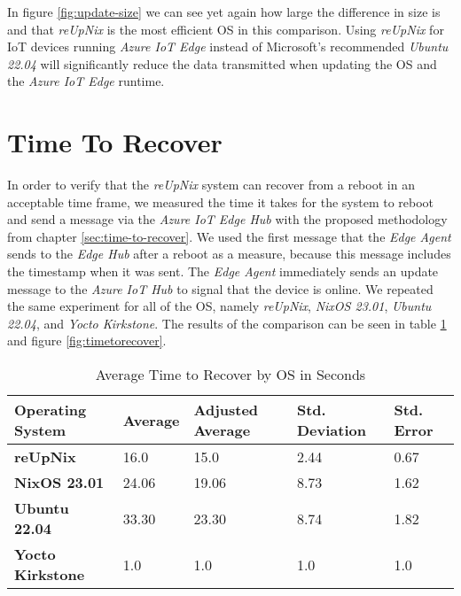 \noindent
In figure \ref{fig:update-size} we can see yet again how large the difference
in size is and that \textit{reUpNix} is the most efficient \ac{OS} in this comparison.
Using \textit{reUpNix} for \ac{IoT} devices running \textit{Azure IoT Edge}
instead of Microsoft's recommended \textit{Ubuntu 22.04} will significantly reduce
the data transmitted when updating the \ac{OS} and the \textit{Azure IoT Edge} runtime.

\section{Time To Recover}
In order to verify that the \textit{reUpNix} system can recover from a reboot
in an acceptable time frame, we measured the time it takes for the system to
reboot and send a message via the \textit{Azure IoT Edge Hub} with the proposed
methodology from chapter \ref{sec:time-to-recover}. We used the first message
that the \textit{Edge Agent} sends to the \textit{Edge Hub} after a reboot as
a measure, because this message includes the timestamp when it was sent.
The \textit{Edge Agent} immediately sends an update message to the \textit{Azure
IoT Hub} to signal that the device is online. We repeated the same experiment
for all of the \ac{OS}, namely \textit{reUpNix}, \textit{NixOS 23.01},
\textit{Ubuntu 22.04}, and \textit{Yocto Kirkstone}. The results of the comparison
can be seen in table \ref{tab:timetorecover} and figure \ref{fig:timetorecover}.


\begin{table}[H]
	\centering
	\begin{tabular}{l|l|l|l|l}
	\toprule
		Operating System & Average & Adjusted Average\footnote &  Std. Deviation & Std. Error \\
	\midrule
    \textbf{reUpNix} & 16.0 & 15.0 &  2.44 & 0.67 \\
    \textbf{NixOS 23.01} & 24.06 & 19.06 & 8.73 & 1.62 \\
    \textbf{Ubuntu 22.04} & 33.30 & 23.30 & 8.74 & 1.82 \\
    \textbf{Yocto Kirkstone} & 1.0 & 1.0 & 1.0  & 1.0 \\
	\bottomrule
	\end{tabular}
	\caption{Average Time to Recover by OS in Seconds}
	\label{tab:timetorecover}
\end{table}

